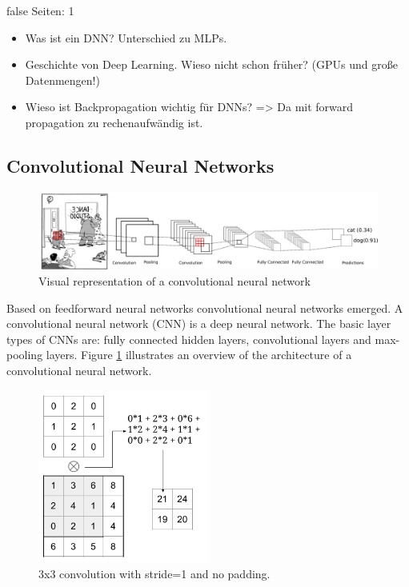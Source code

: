 \documentclass[draft,final,oneside]{vutinfth} %
\begin{document}
\if false
Seiten: 1
\begin{itemize}
\item Was ist ein DNN? Unterschied zu MLPs.
\item Geschichte von Deep Learning. Wieso nicht schon früher? (GPUs und große Datenmengen!)
\item Wieso ist Backpropagation wichtig für DNNs? => Da mit forward propagation zu rechenaufwändig ist.
\end{itemize}
\fi

\subsection{Convolutional Neural Networks} \label{mlcnn}

\begin{figure}[ht]
	\centering
  	\includegraphics[width=1.0\textwidth]{graphics/cnn.png}
	\caption{Visual representation of a convolutional neural network}
	\label{fig:cnn}
\end{figure}

Based on feedforward neural networks convolutional neural networks emerged. A convolutional neural network (CNN) is a deep neural network. The basic layer types of CNNs are: fully connected hidden layers, convolutional layers and max-pooling layers. Figure \ref{fig:cnn} illustrates an overview of the architecture of a convolutional neural network.

\begin{figure}[ht]
	\centering
  	\includegraphics[width=0.5\textwidth]{graphics/convolution.png}
	\caption{3x3 convolution with stride=1 and no padding.}
	\label{fig:convolution}
\end{figure}
\end{document}
